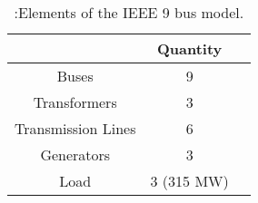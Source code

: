 \begin{table}[h]
	\caption{\label{tb:gridelements}:Elements of the IEEE 9 bus model.}
	\centering
	\begin{tabular}{ccc}
		\toprule
		\textbf{}	& \textbf{Quantity}\\
		\midrule
		Buses		& 9			\\
		Transformers		& 3			\\
 		Transmission Lines			& 6 \\
		Generators			& 3 \\
 		Load			& 3 (315 MW)  \\
		\bottomrule
	\end{tabular}
\end{table}





